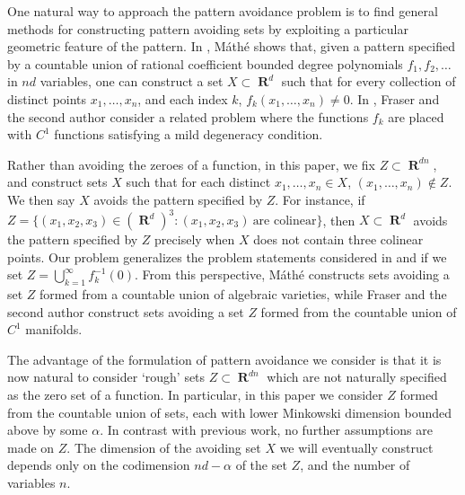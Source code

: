 \documentclass[dvipsnames,letterpaper,12pt]{article}
\numberwithin{equation}{section}
\theoremstyle{plain}
\DeclareMathOperator{\RR}{\mathbf{R}}
\begin{document}
One natural way to approach the pattern avoidance problem is to find general methods for constructing pattern avoiding sets by exploiting a particular geometric feature of the pattern. In \cite{Mathe}, M\'{a}th\'{e} shows that, given a pattern specified by a countable union of rational coefficient bounded degree polynomials $f_1, f_2, \dots$ in $nd$ variables, one can construct a set $X \subset \RR^d$ such that for every collection of distinct points $x_1, \dots, x_n$, and each index $k$, $f_k(x_1, \dots, x_n) \neq 0$. In \cite{MalabikaRob}, Fraser and the second author consider a related problem where the functions $f_k$ are placed with $C^1$ functions satisfying a mild degeneracy condition.



Rather than avoiding the zeroes of a function, in this paper, we fix $Z \subset \RR^{dn}$, and construct sets $X$ such that for each distinct $x_1, \dots, x_n \in X$, $(x_1, \dots, x_n) \not \in Z$. We then say $X$ avoids the pattern specified by $Z$. For instance, if $Z = \{ (x_1,x_2,x_3) \in (\RR^d)^3 : (x_1,x_2,x_3)\ \text{are colinear} \}$, then $X \subset \RR^d$ avoids the pattern specified by $Z$ precisely when $X$ does not contain three colinear points. Our problem generalizes the problem statements considered in \cite{Mathe} and \cite{MalabikaRob} if we set $Z = \bigcup_{k = 1}^\infty f_k^{-1}(0)$. From this perspective, M\'{a}th\'{e} constructs sets avoiding a set $Z$ formed from a countable union of algebraic varieties, while Fraser and the second author construct sets avoiding a set $Z$ formed from the countable union of $C^1$ manifolds.

The advantage of the formulation of pattern avoidance we consider is that it is now natural to consider `rough' sets $Z \subset \RR^{dn}$ which are not naturally specified as the zero set of a function. In particular, in this paper we consider $Z$ formed from the countable union of sets, each with lower Minkowski dimension bounded above by some $\alpha$. In contrast with previous work, no further assumptions are made on $Z$. The dimension of the avoiding set $X$ we will eventually construct depends only on the codimension $nd - \alpha$ of the set $Z$, and the number of variables $n$.
\end{document}
